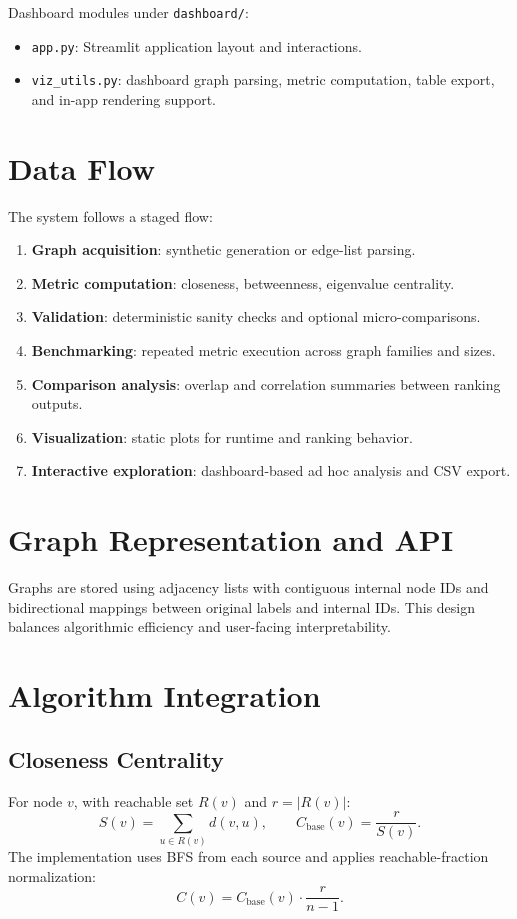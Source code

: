 \documentclass[11pt]{article}
\begin{document}
Dashboard modules under \texttt{dashboard/}:
\begin{itemize}[leftmargin=*]
    \item \texttt{app.py}: Streamlit application layout and interactions.
    \item \texttt{viz\_utils.py}: dashboard graph parsing, metric computation, table export, and in-app rendering support.
\end{itemize}

\section{Data Flow}
The system follows a staged flow:
\begin{enumerate}[leftmargin=*]
    \item \textbf{Graph acquisition}: synthetic generation or edge-list parsing.
    \item \textbf{Metric computation}: closeness, betweenness, eigenvalue centrality.
    \item \textbf{Validation}: deterministic sanity checks and optional micro-comparisons.
    \item \textbf{Benchmarking}: repeated metric execution across graph families and sizes.
    \item \textbf{Comparison analysis}: overlap and correlation summaries between ranking outputs.
    \item \textbf{Visualization}: static plots for runtime and ranking behavior.
    \item \textbf{Interactive exploration}: dashboard-based ad hoc analysis and CSV export.
\end{enumerate}

\section{Graph Representation and API}
Graphs are stored using adjacency lists with contiguous internal node IDs and bidirectional mappings between original labels and internal IDs. This design balances algorithmic efficiency and user-facing interpretability.

\section{Algorithm Integration}
\subsection{Closeness Centrality}
For node $v$, with reachable set $R(v)$ and $r = |R(v)|$:
\[
S(v)=\sum_{u \in R(v)} d(v,u), \qquad C_{\text{base}}(v)=\frac{r}{S(v)}.
\]
The implementation uses BFS from each source and applies reachable-fraction normalization:
\[
C(v)=C_{\text{base}}(v)\cdot\frac{r}{n-1}.
\]
\end{document}
